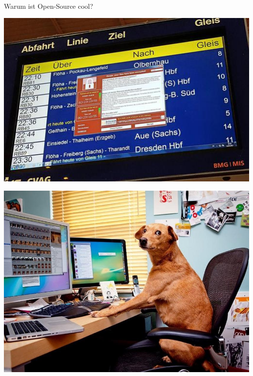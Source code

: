 \begin{frame}
	\centering\Huge Warum ist Open-Source cool?
\end{frame}

\begin{frame}
	\centering\includegraphics[scale=1.7]{resources/wannacrydb.jpg}
\end{frame}

\begin{frame}
	\centering\includegraphics[scale=0.35]{resources/dog.jpg}
\end{frame}

